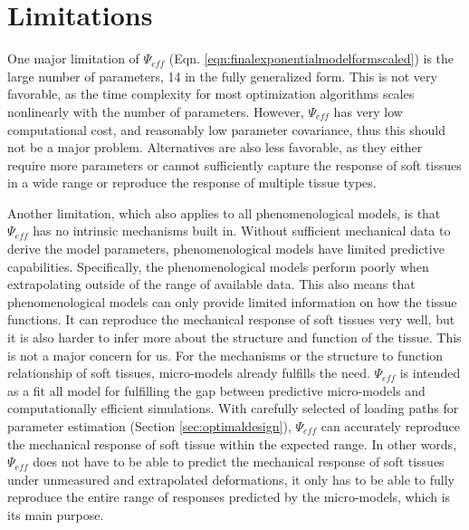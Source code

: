 

\section{Limitations} 
	
    One major limitation of $\Psi_{eff}$ (Eqn. \ref{eqn:finalexponentialmodelformscaled}) is the large number of parameters, 14 in the fully generalized form. This is not very favorable, as the time complexity for most optimization algorithms scales nonlinearly with the number of parameters. However, $\Psi_{eff}$ has very low computational cost, and reasonably low parameter covariance, thus this should not be a major problem. Alternatives are also less favorable, as they either require more parameters or cannot sufficiently capture the response of soft tissues in a wide range or reproduce the response of multiple tissue types. 
    
    Another limitation, which also applies to all phenomenological models, is that $\Psi_{eff}$ has no intrinsic mechanisms built in. Without sufficient mechanical data to derive the model parameters, phenomenological models have limited predictive capabilities. Specifically, the phenomenological models perform poorly when extrapolating outside of the range of available data. This also means that phenomenological models can only provide limited information on how the tissue functions. It can reproduce the mechanical response of soft tissues very well, but it is also harder to infer more about the structure and function of the tissue. This is not a major concern for us. For the mechanisms or the structure to function relationship of soft tissues, micro-models already fulfills the need. $\Psi_{eff}$ is intended as a fit all model for fulfilling the gap between predictive micro-models and computationally efficient simulations. With carefully selected of loading paths for parameter estimation (Section \ref{sec:optimaldesign}), $\Psi_{eff}$ can accurately reproduce the mechanical response of soft tissue within the expected range. In other words, $\Psi_{eff}$ does not have to be able to predict the mechanical response of soft tissues under unmeasured and extrapolated deformations, it only has to be able to fully reproduce the entire range of responses predicted by the micro-models, which is its main purpose. 



